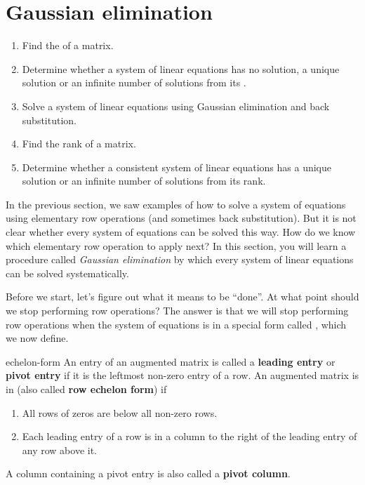 \section{Gaussian elimination}

\begin{outcome}
  \begin{enumerate}
  \item Find the {\ef} of a matrix.
  \item Determine whether a system of linear equations has no
    solution, a unique solution or an infinite number of solutions
    from its {\ef}.
  \item Solve a system of linear equations using Gaussian elimination
    and back substitution.
  \item Find the rank of a matrix.
  \item Determine whether a consistent system of linear equations has
    a unique solution or an infinite number of solutions from its
    rank.
  \end{enumerate}
\end{outcome}

In the previous section, we saw examples of how to solve a system of
equations using elementary row operations (and sometimes back
substitution). But it is not clear whether every system of equations
can be solved this way. How do we know which elementary row operation
to apply next? In this section, you will learn a procedure called {\em
  Gaussian elimination} by which every system of linear equations can
be solved systematically.

Before we start, let's figure out what it means to be ``done''. At
what point should we stop performing row operations? The answer is
that we will stop performing row operations when the system of
equations is in a special form called {\em {\ef}}, which we now define.

\begin{definition}{\Ef}{echelon-form}
  An entry of an augmented matrix is called a
  \textbf{leading entry} or
  \textbf{pivot entry}
  if it is the leftmost non-zero entry of a row.
  An augmented matrix is in
  \textbf{\ef}\eindex{\ef}
  (also called \textbf{row echelon form}) if
  \begin{enumerate}
  \item All rows of zeros are below all non-zero rows.

  \item Each leading entry of a row is in a column to the right of the
    leading entry of any row above it.
  \end{enumerate}
  A column containing a pivot entry is also called a
  \textbf{pivot column}.
\end{definition}

